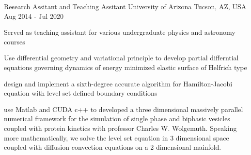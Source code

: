   \cventry
    {Research Assitant and Teaching Assitant} %
    {University of Arizona} %
    {Tucson, AZ, USA} %
    {Aug 2014 - Jul 2020} %
    {
      \begin{cvitems} %
         \item {Served as teaching assistant for various undergraduate physics and astronomy courses}
         \item {Use differential geometry and variational principle to develop partial differntial equations governing dynamics of energy minimized elastic surface of Helfrich type}
         \item {design and implement a sixth-degree accurate algorithm for Hamilton-Jacobi equation with level set defined boundary conditions}
         \item {use Matlab and CUDA c++ to developed a three dimensional massively parallel numerical framework for the simulation of single phase and biphasic vesicles coupled with protein kinetics with professor Charles W. Wolgemuth. Speaking more mathematically, we solve the level set equation in 3 dimensional space coupled with diffusion-convection equations on a 2 dimensional mainfold.}
      \end{cvitems}
    }
  
